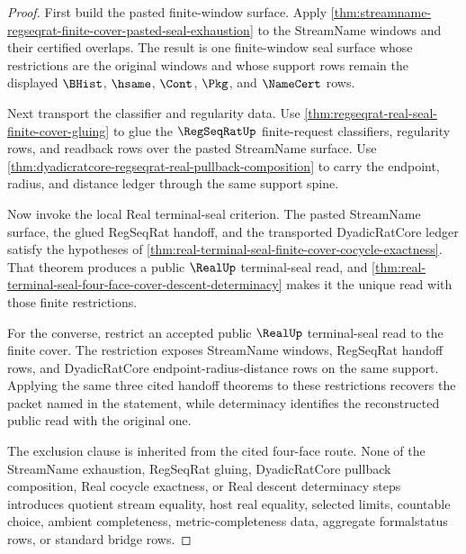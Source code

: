 \begin{proof}
First build the pasted finite-window surface. Apply
\autoref{thm:streamname-regseqrat-finite-cover-pasted-seal-exhaustion} to the
StreamName windows and their certified overlaps. The result is one
finite-window seal surface whose restrictions are the original windows and
whose support rows remain the displayed $\BHist$, $\hsame$, $\Cont$, $\Pkg$,
and $\NameCert$ rows.

Next transport the classifier and regularity data. Use
\autoref{thm:regseqrat-real-seal-finite-cover-gluing} to glue the
$\RegSeqRatUp$ finite-request classifiers, regularity rows, and readback rows
over the pasted StreamName surface. Use
\autoref{thm:dyadicratcore-regseqrat-real-pullback-composition} to carry the
endpoint, radius, and distance ledger through the same support spine.

Now invoke the local Real terminal-seal criterion. The pasted StreamName
surface, the glued RegSeqRat handoff, and the transported DyadicRatCore ledger
satisfy the hypotheses of
\autoref{thm:real-terminal-seal-finite-cover-cocycle-exactness}. That theorem
produces a public $\RealUp$ terminal-seal read, and
\autoref{thm:real-terminal-seal-four-face-cover-descent-determinacy} makes it
the unique read with those finite restrictions.

For the converse, restrict an accepted public $\RealUp$ terminal-seal read to
the finite cover. The restriction exposes StreamName windows, RegSeqRat
handoff rows, and DyadicRatCore endpoint-radius-distance rows on the same
support. Applying the same three cited handoff theorems to these restrictions
recovers the packet named in the statement, while determinacy identifies the
reconstructed public read with the original one.

The exclusion clause is inherited from the cited four-face route. None of the
StreamName exhaustion, RegSeqRat gluing, DyadicRatCore pullback composition,
Real cocycle exactness, or Real descent determinacy steps introduces quotient
stream equality, host real equality, selected limits, countable choice,
ambient completeness, metric-completeness data, aggregate formalstatus rows,
or standard bridge rows.
\end{proof}

